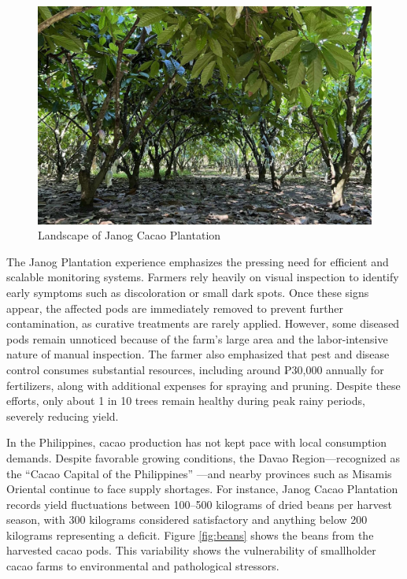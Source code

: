 {\begin{figure}[H]
	\centering
	\caption{Landscape of Janog Cacao Plantation}
	\label{fig:landscape}
	\includegraphics[width=1\textwidth]{figures/Landscape.pdf}
\end{figure}

The Janog Plantation experience emphasizes the pressing need for efficient and scalable monitoring systems. Farmers rely heavily on visual inspection to identify early symptoms such as discoloration or small dark spots. Once these signs appear, the affected pods are immediately removed to prevent further contamination, as curative treatments are rarely applied. However, some diseased pods remain unnoticed because of the farm’s large area and the labor-intensive nature of manual inspection. The farmer also emphasized that pest and disease control consumes substantial resources, including around ₱30,000 annually for fertilizers, along with additional expenses for spraying and pruning. Despite these efforts, only about 1 in 10 trees remain healthy during peak rainy periods, severely reducing yield.

In the Philippines, cacao production has not kept pace with local consumption demands. Despite favorable growing conditions, the Davao Region—recognized as the “Cacao Capital of the Philippines” \cite{PCAF2021}—and nearby provinces such as Misamis Oriental continue to face supply shortages. For instance, Janog Cacao Plantation records yield fluctuations between 100–500 kilograms of dried beans per harvest season, with 300 kilograms considered satisfactory and anything below 200 kilograms representing a deficit. Figure \ref{fig:beans} shows the beans from the harvested cacao pods. This variability shows the vulnerability of smallholder cacao farms to environmental and pathological stressors.

}
